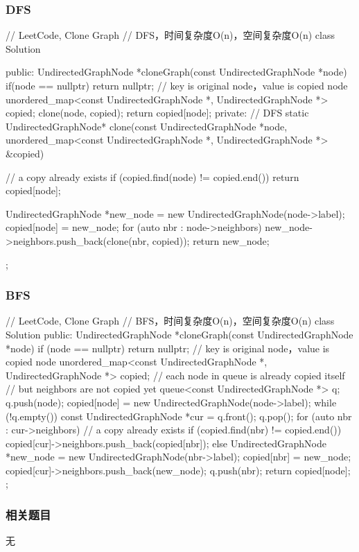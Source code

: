 \subsubsection{DFS}
\begin{Code}
	// LeetCode, Clone Graph
	// DFS，时间复杂度O(n)，空间复杂度O(n)
	class Solution {
		public:
		UndirectedGraphNode *cloneGraph(const UndirectedGraphNode *node) {
			if(node == nullptr) return nullptr;
			// key is original node，value is copied node
			unordered_map<const UndirectedGraphNode *,
			UndirectedGraphNode *> copied;
			clone(node, copied);
			return copied[node];
		}
		private:
		// DFS
		static UndirectedGraphNode* clone(const UndirectedGraphNode *node,
		unordered_map<const UndirectedGraphNode *,
		UndirectedGraphNode *> &copied) {
			// a copy already exists
			if (copied.find(node) != copied.end()) return copied[node];
			
			UndirectedGraphNode *new_node = new UndirectedGraphNode(node->label);
			copied[node] = new_node;
			for (auto nbr : node->neighbors)
			new_node->neighbors.push_back(clone(nbr, copied));
			return new_node;
		}
	};
\end{Code}


\subsubsection{BFS}
\begin{Code}
	// LeetCode, Clone Graph
	// BFS，时间复杂度O(n)，空间复杂度O(n)
	class Solution {
		public:
		UndirectedGraphNode *cloneGraph(const UndirectedGraphNode *node) {
			if (node == nullptr) return nullptr;
			// key is original node，value is copied node
			unordered_map<const UndirectedGraphNode *,
			UndirectedGraphNode *> copied;
			// each node in queue is already copied itself
			// but neighbors are not copied yet
			queue<const UndirectedGraphNode *> q;
			q.push(node);
			copied[node] = new UndirectedGraphNode(node->label);
			while (!q.empty()) {
				const UndirectedGraphNode *cur = q.front();
				q.pop();
				for (auto nbr : cur->neighbors) {
					// a copy already exists
					if (copied.find(nbr) != copied.end()) {
						copied[cur]->neighbors.push_back(copied[nbr]);
					} else {
					UndirectedGraphNode *new_node =
					new UndirectedGraphNode(nbr->label);
					copied[nbr] = new_node;
					copied[cur]->neighbors.push_back(new_node);
					q.push(nbr);
				}
			}
		}
		return copied[node];
	}
};
\end{Code}


\subsubsection{相关题目}
\begindot
\item 无
\myenddot

